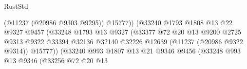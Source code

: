 \begin{lexlean}{RustStd}
\begin{coremodule}
                                                      (@11237 (@20986 @9303 @9295))
                                                      @15777))
                                                  (@33240
                                                    @1793
                                                    @1808
                                                    @13
                                                    @22
                                                    @9327
                                                    @9457
                                                    (@33248
                                                      @1793
                                                      @13
                                                      @9327
                                                      (@33377
                                                        @72
                                                        @20
                                                        @13
                                                        @9200
                                                        @2725
                                                        @9313
                                                        @9322
                                                        @33394
                                                        @32136
                                                        @32140
                                                        @32226
                                                        @12639
                                                        (@11237 (@20986 @9322 @9314))
                                                        @15777))
                                                    (@33240
                                                      @993
                                                      @1807
                                                      @13
                                                      @21
                                                      @9346
                                                      @9456
                                                      (@33248
                                                        @993
                                                        @13
                                                        @9346
                                                        (@33256
                                                          @72
                                                          @20
                                                          @13

\end{coremodule}
\end{lexlean}
